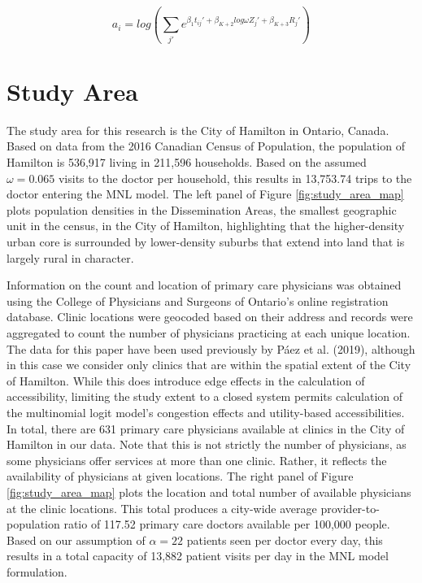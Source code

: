\documentclass[]{elsarticle} %
\begin{document}
\[
a_i = log(\sum_{j\prime} e^{\beta_1 t_{ij}\prime + \beta_{K+2} log \omega Z_j\prime + \beta_{K + 3} R_j\prime})
\]

\hypertarget{study-area}{%
\section{Study Area}\label{study-area}}

The study area for this research is the City of Hamilton in Ontario,
Canada. Based on data from the 2016 Canadian Census of Population, the
population of Hamilton is 536,917 living in 211,596 households. Based on
the assumed \(\omega = 0.065\) visits to the doctor per household, this
results in 13,753.74 trips to the doctor entering the MNL model. The
left panel of Figure \ref{fig:study_area_map} plots population densities
in the Dissemination Areas, the smallest geographic unit in the census,
in the City of Hamilton, highlighting that the higher-density urban core
is surrounded by lower-density suburbs that extend into land that is
largely rural in character.

Information on the count and location of primary care physicians was
obtained using the College of Physicians and Surgeons of Ontario's
online registration database. Clinic locations were geocoded based on
their address and records were aggregated to count the number of
physicians practicing at each unique location. The data for this paper
have been used previously by Páez et al. (2019), although in this case
we consider only clinics that are within the spatial extent of the City
of Hamilton. While this does introduce edge effects in the calculation
of accessibility, limiting the study extent to a closed system permits
calculation of the multinomial logit model's congestion effects and
utility-based accessibilities. In total, there are 631 primary care
physicians available at clinics in the City of Hamilton in our data.
Note that this is not strictly the number of physicians, as some
physicians offer services at more than one clinic. Rather, it reflects
the availability of physicians at given locations. The right panel of
Figure \ref{fig:study_area_map} plots the location and total number of
available physicians at the clinic locations. This total produces a
city-wide average provider-to-population ratio of 117.52 primary care
doctors available per 100,000 people. Based on our assumption of
\(\alpha = 22\) patients seen per doctor every day, this results in a
total capacity of 13,882 patient visits per day in the MNL model
formulation.
\end{document}
